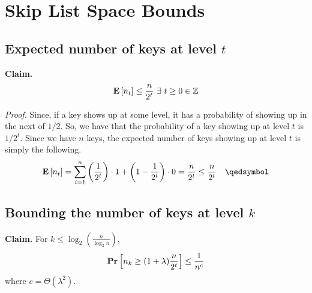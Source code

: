 \chapter{Skip List Space Bounds}

\section{Expected number of keys at level $t$}

\textbf{Claim.} \[ \mathbf{E}\left[n_t\right] \leq \frac{n}{2^t}\ \exists\ t\geq 0\in\mathbb Z \]

\textit{Proof.} Since, if a key shows up at some level, it has a probability of showing up in the next of $1/2$. So, we have that the probability of a key showing up at level $t$ is $1/2^t$. Since we have $n$ keys, the expected number of keys showing up at level $t$ is simply the following.
\[ \ex{n_t} = \sum_{i=1}^n \left(\frac{1}{2^t}\right)\cdot 1 + \left(1 - \frac{1}{2^t}\right)\cdot 0 = \frac{n}{2^t} \leq \frac{n}{2^t}\quad \qedsymbol \]

\section{Bounding the number of keys at level $k$}

\textbf{Claim.} For $k \leq \log_2\left(\frac{n}{\log_2 n}\right)$, 
\[ \mathbf{Pr}\left[n_k \geq (1 + \lambda)\frac{n}{2^t}\right] \leq \frac{1}{n^c} \]
where $c = \Theta(\lambda^2)$.

